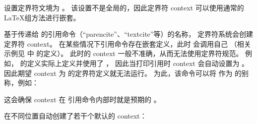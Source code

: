 \begin{ltxsyntax}


设置定界符文境为 。
该设置不是全局的，因此定界符 context 可以使用通常的 \LaTeX 组方法进行嵌套。



基于传递给  的引用命令（“parencite”、“textcite”等）的名称，
定界符系统会创建定界符 context。
在某些情况下引用命令存在嵌套定义，此时  会调用自己
（相关示例见  中  的定义）。
此时的 context 一般不准确，从而无法使用定界符规范。
例如， 的定义实际上定义并使用了 ，
因此当打印引用时 context 会自动设置为 。
因此期望 context 为  的定界符定义就无法运行。
为此，该命令可以将  作为  的别称，例如：

\begin{ltxexample}[style=latex]{}
\end{ltxexample}
%
这会确保 context 在  引用命令内部时就是预期的 。

\end{ltxsyntax}
%
\biblatex 在不同位置自动创建了若干个默认的 context：

